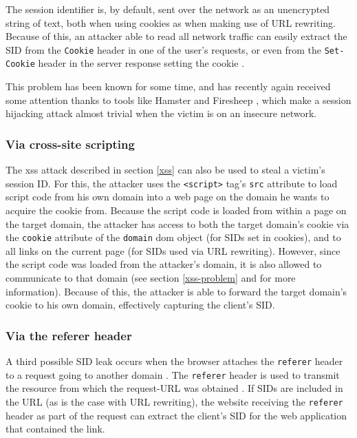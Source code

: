 The session identifier is, by default, sent over the network as an unencrypted string of text, both when using cookies as when making use of URL rewriting. Because of this, an attacker able to read all network traffic can easily extract the SID from the \texttt{Cookie} header in one of the user's requests, or even from the \texttt{Set-Cookie} header in the server response setting the cookie \cite{Adida2008}.

This problem has been known for some time, and has recently again received some attention thanks to tools like Hamster \cite{Graham2007} and Firesheep \cite{Butler2010}, which make a session hijacking attack almost trivial when the victim is on an insecure network.

\subsubsection{Via cross-site scripting}

The \gls{xss} attack described in section \ref{xss} can also be used to steal a victim's session ID. For this, the attacker uses the \texttt{<script>} tag's \texttt{src} attribute to load script code from his own domain into a web page on the domain he wants to acquire the cookie from. Because the script code is loaded from within a page on the target domain, the attacker has access to both the target domain's cookie via the \texttt{cookie} attribute of the \texttt{domain} \gls{dom} object (for SIDs set in cookies), and to all links on the current page (for SIDs used via URL rewriting). However, since the script code was loaded from the attacker's domain, it is also allowed to communicate to that domain (see section \ref{xss-problem} and \cite{Klein2002} for more information). Because of this, the attacker is able to forward the target domain's cookie to his own domain, effectively capturing the client's SID.

\subsubsection{Via the referer header}

A third possible SID leak occurs when the browser attaches the \texttt{referer} header to a request going to another domain \cite{Fu2001}. The \texttt{referer} header is used to transmit the resource from which the request-URL was obtained \cite{rfc2616}. If SIDs are included in the URL (as is the case with URL rewriting), the website receiving the \texttt{referer} header as part of the request can extract the client's SID for the web application that contained the link.

